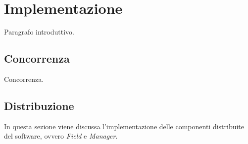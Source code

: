 
\section*{Implementazione}
%
\label{sec:implementazione}

Paragrafo introduttivo.

\subsection*{Concorrenza}
%
\label{sec:implemetazione_concorrenza}

Concorrenza.

\subsection*{Distribuzione}
%
\label{sec:implementazione_distribuzione}

In questa sezione viene discussa l'implementazione delle componenti distribuite del software, ovvero \emph{Field} e \emph{Manager}.

